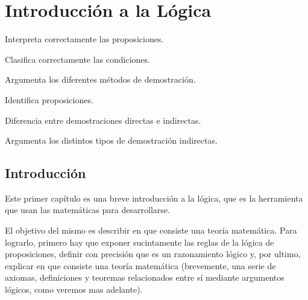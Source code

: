
\pagecolor{white} \mainmatter \pagestyle{headings} 


\chapter{Introducci\'on a la L\'ogica }

 \chaptertoc  

\begin{competencias}  \begin{lista}  

\item Interpreta correctamente las proposiciones. 

\item Clasifica correctamente las condiciones. 

\item Argumenta los diferentes métodos de demostración. 

\end{lista} \end{competencias}

\begin{logros}  \begin{lista}  

\item Identifica proposiciones. 

\item Diferencia entre demostraciones directas e indirectas. 

\item Argumenta los distintos tipos de demostraci\'{o}n indirectas. 

\end{lista} \end{logros}


\section{Introducción}

Este primer capítulo es una breve introducción a la lógica, que es
la herramienta que usan las matemáticas para desarrollarse.

El objetivo del mismo es describir en que consiste una teoría matemática.
Para lograrlo, primero hay que exponer sucintamente las reglas de
la lógica de proposiciones, definir con precisión que es un razonamiento
lógico y, por ultimo, explicar en que consiste una teoría matemática
(brevemente, una serie de axiomas, definiciones y teoremas relacionados
entre sí mediante argumentos lógicos, como veremos mas adelante). 

